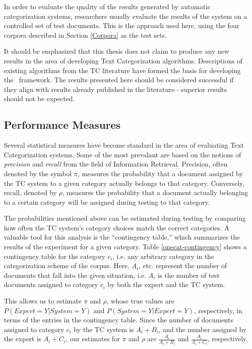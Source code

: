 In order to evaluate the quality of the results generated by automatic
categorization systems, researchers usually evaluate the results of
the system on a controlled set of test documents.
\cite[pp. 9 \& 37]{sebastiani:02} This is the approach used here,
using the four corpora described in Section \ref{Corpora} as the test
sets.

It should be emphasized that this thesis does not claim to produce any
new results in the area of developing Text Categorization algorithms.
Descriptions of existing algorithms from the TC literature have formed
the basis for developing the \aicat\ framework.  The results presented
here should be considered successful if they align with results
already published in the literature---superior results should not be
expected.

\subsection{Performance Measures}
\label{measures}

Several statistical measures have become standard in the area of
evaluating Text Categorization systems.\cite[p. 33]{sebastiani:02}
Some of the most prevalant are based on the notions of
\emph{precision} and \emph{recall} from the field of Information
Retrieval.\cite{rijsbergen:79} Precision, often denoted by the symbol
$\pi$, measures the probability that a document assigned by the TC
system to a given category actually belongs to that category.
Conversely, recall, denoted by $\rho$, measures the probability that a
document actually belonging to a certain category will be assigned
during testing to that category.\cite[p. 33]{sebastiani:02}

The probabilities mentioned above can be estimated during testing by
comparing how often the TC system's category choices match the correct
categories.  A valuable tool for this analysis is the ``contingency
table,'' which summarizes the results of the experiment for a given
category.  Table \ref{onecat-contingency} shows a contingency table
for the category $c_i$, i.e. any arbitrary category in the
categorization scheme of the corpus.  Here, $A_i$, etc. represent the
number of documents that fall into the given situation, i.e. $A_i$ is
the number of test documents assigned to category $c_i$ by both the
expert and the TC system.

This allows us to estimate $\pi$ and $\rho$, whose true values are
$P(Expert=Y | System=Y)$ and $P(System=Y | Expert=Y)$, respectively,
in terms of the entries in the contingency table.  Since the number of
documents assigned to category $c_i$ by the TC system is $A_i+B_i$,
and the number assigned by the expert is $A_i+C_i$, our estimates for
$\pi$ and $\rho$ are $\frac{A_i}{A_i + B_i}$ and $\frac{A_i}{A_i +
C_i}$, respectively.



